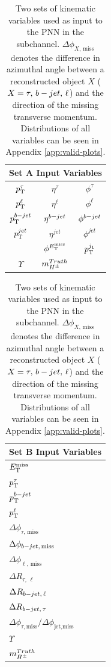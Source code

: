       \begin{table}[!thp]
				\caption{Two sets of kinematic variables used as input to the \gls{PNN} in the \taulep subchannel. $\Delta \phi_{X,\,\text{miss}}$ denotes the difference in azimuthal angle between a reconstructed object $X$ ($X = \tau,\,b-jet,\,\ell$) and the direction of the missing transverse momentum. Distributions of all variables can be seen in Appendix \ref{app:valid-plots}.}
				\label{tab:taulep-input-variables-high-v-low}
				\begin{subtable}[c]{0.15\textwidth}
					\centering
					\begin{tabular}{| c | c | c |}
		        \multicolumn{3}{c}{\textbf{Set A Input Variables}} \\ \hline \hline
		        $p_{\text{T}}^{\tau}$ & $\eta^{\tau}$ & $\phi^{\tau}$  \\ \hline
		        $p_{\text{T}}^{\ell}$ & $\eta^{\ell}$ & $\phi^{\ell}$  \\ \hline
		        $p_{\text{T}}^{b-jet}$ & $\eta^{b-jet}$ & $\phi^{b-jet}$  \\ \hline
		        $p_{\text{T}}^{jet}$ & $\eta^{jet}$ & $\phi^{jet}$  \\ \hline
		        \Etm & $\phi^{E_\text{T}^\text{miss}}$ & $p_{\text{T}}^{j_{1}}$  \\ \hline
		        $\Upsilon$ & $m_{H^{\pm}}^{Truth}$ &  \\ \hline 
	        \end{tabular}
	      \end{subtable}

				\begin{subtable}[c]{0.25\textwidth}
					\centering
					\begin{tabular}{| l |}
						\hline
						\textbf{Set B Input Variables} \\
						\hline \hline
						$E_\text{T}^\text{miss}$  \\
						$p_{\text{T}}^{\tau}$  \\
						$p_{\text{T}}^{b-jet}$  \\
						$p_{\text{T}}^{\ell}$  \\
						$\Delta \phi_{\tau,\,\text{miss}}$  \\
						$\Delta \phi_{b-jet,\,\text{miss}}$  \\
						$\Delta \phi_{\ell,\,\text{miss}}$  \\
						$\Delta R_{\tau,\,\ell}$ \\
						$\Delta R_{b-jet,\,\ell}$ \\
						$\Delta R_{b-jet,\,\tau}$ \\
						$\Delta \phi_{\tau, \text{miss}} / \Delta \phi_{\text{jet}, \text{miss}}$  \\
						$\Upsilon$ \\
						$m_{H^{\pm}}^{Truth}$ \\ \hline
					\end{tabular}
				\end{subtable}
			\end{table}

